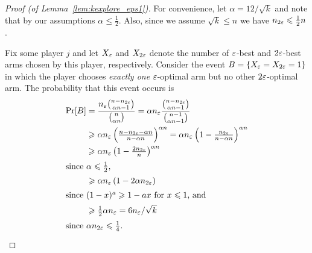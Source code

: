 \documentclass[12pt]{article}
\begin{document}
\begin{proof}[Proof (of Lemma~\ref{lem:kexplore_eps1})]
For convenience, let $\alpha = 12/\sqrt{k}$ and note that by our assumptions $\alpha \le \tfrac{1}{2}$.
Also, since we assume $\sqrt{k} \le n$ we have $n_{2\varepsilon} \leqslant \tfrac{1}{2}n$.

Fix some player $j$ and let $X_{\varepsilon}$ and $X_{2\varepsilon}$ denote the number of $\varepsilon$-best and $2\varepsilon$-best arms chosen by this player, respectively. 
Consider the event $B = \{X_{\varepsilon} = X_{2\varepsilon} = 1\}$ in which the player chooses \emph{exactly one} $\varepsilon$-optimal arm but no other $2\varepsilon$-optimal arm.
The probability that this event occurs is
\begin{align*}
	\Pr[B]
	&= \frac{n_{\varepsilon} {n - n_{2\varepsilon} \choose \alpha n - 1}}
		{{n \choose \alpha n}}
	= \alpha n_{\varepsilon} \frac{{n - n_{2\varepsilon} \choose \alpha n - 1}}
		{{n-1 \choose \alpha n - 1}} \\
	&\geqslant \alpha n_{\varepsilon} \left( \tfrac{n - n_{2\varepsilon} - \alpha n}{n-\alpha n} \right)^{\alpha n}
	= \alpha n_{\varepsilon} \left( 1 - \tfrac{n_{2\varepsilon}}{n-\alpha n} \right)^{\alpha n} \\
	&\geqslant \alpha n_{\varepsilon} \left( 1 - \tfrac{2 n_{2\varepsilon}}{n} \right)^{\alpha n} \\
	\intertext{since $\alpha \leqslant \tfrac{1}{2}$,}
	&\geqslant \alpha n_{\varepsilon} \left( 1- 2 \alpha n_{2\varepsilon} \right) \\
	\intertext{since $(1-x)^a \geqslant 1-ax$ for $x \leqslant 1$, and}
	&\geqslant \tfrac{1}{2}\alpha n_{\varepsilon} = 6 n_{\varepsilon}/\sqrt{k} \\
	\intertext{since $\alpha n_{2\varepsilon} \leqslant \frac{1}{4}$.}
\end{align*}


\end{proof}
\end{document}
